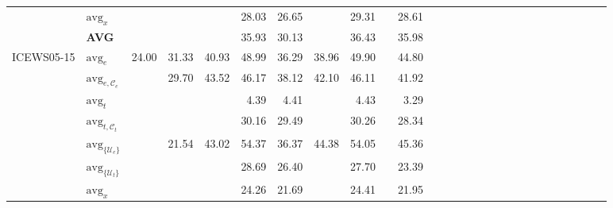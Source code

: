 \begin{table*}[!t]
{\begin{tabular}{l l r r r r r r r r r r r r r r r r r r r r r r r r r}
                                  & $\text{avg}_{x}$                  &                    &                &               & 28.03          & 26.65            &               & 29.31         &  & 28.61            \\  %
                                  & \textbf{AVG}                      &                    &                &               & 35.93          & 30.13            &               & 36.43         &  & 35.98            \\  %
      \midrule
      \multirow{8}{*}{ICEWS05-15} & $\text{avg}_{e} $                 & 24.00              & 31.33          & 40.93         & 48.99          & 36.29            & 38.96         & 49.90         &  & 44.80            \\  %
                                  & $\text{avg}_{e , \mathcal{C}_e}$  &                    & 29.70          & 43.52         & 46.17          & 38.12            & 42.10         & 46.11         &  & 41.92            \\  %
                                  & $\text{avg}_{t} $                 &                    &                &               & 4.39           & 4.41             &               & 4.43          &  & 3.29             \\  %
                                  & $\text{avg}_{t , \mathcal{C}_t}$  &                    &                &               & 30.16          & 29.49            &               & 30.26         &  & 28.34            \\  %
                                  & $\text{avg}_{\{\mathcal{U}_e\}}$  &                    & 21.54          & 43.02         & 54.37          & 36.37            & 44.38         & 54.05         &  & 45.36            \\  %
                                  & $\text{avg}_{\{\mathcal{U}_t\}}$  &                    &                &               & 28.69          & 26.40            &               & 27.70         &  & 23.39            \\  %
                                  & $\text{avg}_{x}$                  &                    &                &               & 24.26          & 21.69            &               & 24.41         &  & 21.95            \\  %

\end{tabular}}
\end{table*}
